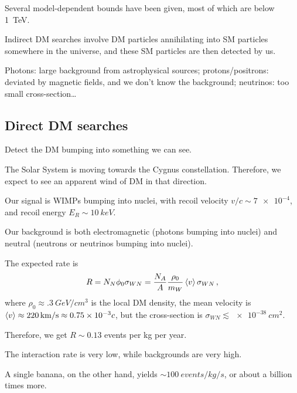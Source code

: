 \documentclass[main.tex]{subfiles}
\begin{document}
Several model-dependent bounds have been given, most of which are below \SI{1}{TeV}. 

Indirect DM searches involve DM particles annihilating into SM particles somewhere in the universe, and these SM particles are then detected by us.  

Photons: large background from astrophysical sources; protons/positrons: deviated by magnetic fields, and we don't know the background; neutrinos: too small cross-section\dots


\subsection{Direct DM searches}

Detect the DM bumping into something we can see. 

The Solar System is moving towards the Cygnus constellation. 
Therefore, we expect to see an apparent wind of DM in that direction.



Our signal is WIMPs bumping into nuclei, with recoil velocity \(v/c \sim \num{7e-4}\), and recoil energy \(E_R \sim \SI{10}{keV}\).

Our background is both electromagnetic (photons bumping into nuclei) and neutral (neutrons or neutrinos bumping into nuclei). 

The expected rate is 
%
\begin{align}
R = N_N \phi_0 \sigma_{WN} = \frac{N_A}{A} \frac{\rho_0 }{m_W} \expval{v} \sigma_{WN}
\,,
\end{align}
%
where \(\rho_0 \approx \SI{.3}{GeV / cm^3}\) is the local DM density, the mean velocity is \(\expval{v} \approx \SI{220}{km/s} \approx \num{.75e-3} c\), but the cross-section is \(\sigma_{WN} \lesssim \SI{e-38}{cm^2}\).

Therefore, we get \(R \sim \num{0.13}\) events per kg per year. 

The interaction rate is very low, while backgrounds are very high.

A single banana, on the other hand, yields \(\sim \SI{100}{events/kg/s}\), or about a billion times more.
\end{document}
